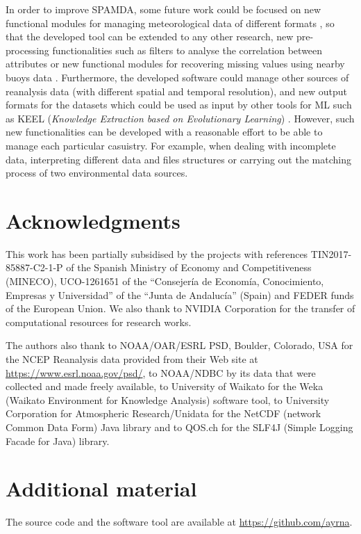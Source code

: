 \documentclass[review]{elsarticle}
\begin{document}
		In order to improve SPAMDA, some future work could be focused on new functional modules for managing meteorological data of different formats \cite{NOAA_3}, so that the developed tool can be extended to any other research, new pre-processing functionalities such as filters to analyse the correlation between attributes or new functional modules for recovering missing values using nearby buoys data \cite{DuranRosal2016}. Furthermore, the developed software could manage other sources of reanalysis data (with different spatial and temporal resolution), and new output formats for the datasets which could be used as input by other tools for ML such as KEEL (\textit{Knowledge Extraction based on Evolutionary Learning}) \cite{AlcalFdez2009KEELAS}. However, such new functionalities can be developed with a reasonable effort to be able to manage each particular casuistry. For example, when dealing with incomplete data, interpreting different data and files structures or carrying out the matching process of two environmental data sources.
		
		
	\section*{Acknowledgments}
	
		This work has been partially subsidised by the projects with references TIN2017-85887-C2-1-P of the Spanish Ministry of Economy and Competitiveness (MI\-NE\-CO), UCO-1261651 of the ``Consejer\'ia de Econom\'ia, Conocimiento, Empresas y Universidad'' of the ``Junta de Andaluc\'ia'' (Spain) and FEDER funds of the European Union. We also thank to NVIDIA Corporation for the transfer of computational resources for research works.
		
		The authors also thank to NOAA/OAR/ESRL PSD, Boulder, Colorado, USA for the NCEP Reanalysis data provided from their Web site at \url{https://www.esrl.noaa.gov/psd/}, to NOAA/NDBC by its data that were collected and made freely available, to University of Waikato for the Weka (Waikato Environment for Knowledge Analysis) software tool, to University Corporation for Atmospheric Research/Unidata for the NetCDF (network Common Data Form) Java library and to QOS.ch for the SLF4J (Simple Logging Facade for Java) library.
		
	\section*{Additional material}
	
		The source code and the software tool are available at \url{https://github.com/ayrna}.
		
\end{document}
